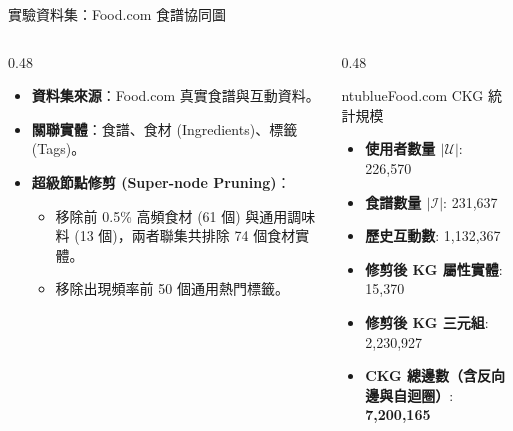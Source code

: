 \documentclass[aspectratio=169, 10pt]{beamer}
\begin{document}
\begin{frame}{實驗資料集：Food.com 食譜協同圖}
  \begin{columns}[t]
    \begin{column}{0.48\textwidth}
      \begin{itemize}
        \item \alert{\textbf{資料集來源}}：Food.com 真實食譜與互動資料。
        \item \alert{\textbf{關聯實體}}：食譜、食材 (Ingredients)、標籤 (Tags)。
        \item \alert{\textbf{超級節點修剪 (Super-node Pruning)}}：
          \begin{itemize}
            \item 移除前 0.5\% 高頻食材 (61 個) 與通用調味料 (13 個)，兩者聯集共排除 74 個食材實體。
            \item 移除出現頻率前 50 個通用熱門標籤。
          \end{itemize}
      \end{itemize}
    \end{column}

    \begin{column}{0.48\textwidth}
      \begin{mybox}{ntublue}{Food.com CKG 統計規模}
        \small
        \begin{itemize}
          \item \textbf{使用者數量 $|\mathcal{U}|$}: 226,570
          \item \textbf{食譜數量 $|\mathcal{I}|$}: 231,637
          \item \textbf{歷史互動數}: 1,132,367
          \item \textbf{修剪後 KG 屬性實體}: 15,370
          \item \textbf{修剪後 KG 三元組}: 2,230,927
          \item \textbf{CKG 總邊數（含反向邊與自迴圈）}: \textbf{7,200,165}
        \end{itemize}
      \end{mybox}
    \end{column}
  \end{columns}
\end{frame}
\end{document}
